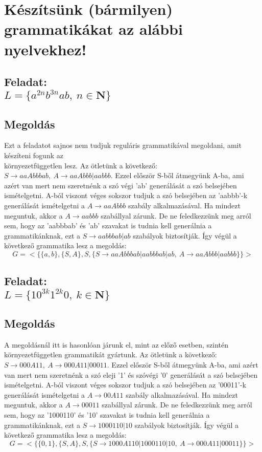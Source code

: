\documentclass[12pt]{article}
\begin{document}
\section{Készítsünk (bármilyen) grammatikákat az alábbi nyelvekhez!}
\subsection{Feladat: \\
$ L=\{ a^{2n}b^{3n}ab, \ n \in \mathbf{N} \} $}
\maketitle
\subsection{Megoldás}
Ezt a feladatot sajnos nem tudjuk reguláris grammatikával megoldani, amit készíteni fogunk az \\
környezetfüggetlen lesz. Az ötletünk a következő: $ S \rightarrow aaAbbbab, \ A \rightarrow aaAbbb|aabbb $.
Ezzel először S-ből átmegyünk A-ba, ami azért van mert nem szeretnénk a szó végi 'ab' generálását a szó
belsejében ismételgetni. A-ból viszont véges sokszor tudjuk a szó belsejében az 'aabbb'-k generálását
ismételgetni a $ A \rightarrow aaAbbb $ szabály alkalmazásával. Ha mindezt meguntuk, akkor
a $ A \rightarrow aabbb $ szabállyal zárunk. De ne feledkezzünk meg arról sem, hogy az 'aabbbab' és 'ab'
szavakat is tudnia kell generálnia a grammatikánknak, ezt a $ S \rightarrow aabbbab|ab $ szabályok biztosítják.
Így végül a következő grammatika lesz a megoldás:
$$ G=<\{ \{a,b \}, \{S,A \}, S, \{ S \rightarrow aaAbbbab|aabbbab|ab, \ A \rightarrow aaAbbb|aabbb \} \}> $$

\subsection{Feladat: \\
$ L=\{ 10^{3k}1^{2k}0, \ k \in \mathbf{N} \} $}
\maketitle
\subsection{Megoldás}
A megoldásnál itt is hasonlóan járunk el, mint az előző esetben, szintén környezetfüggetlen grammatikát gyártunk.
Az ötletünk a következő: $ S \rightarrow 000A11, \ A \rightarrow 000A11|00011 $.
Ezzel először S-ből átmegyünk A-ba, ami azért van mert nem szeretnénk a szó eleji '1' és szóvégi '0' 
generálását a szó belsejében ismételgetni. A-ból viszont véges sokszor tudjuk a szó belsejében az '00011'-k
generálását ismételgetni a $ A \rightarrow 00A11 $ szabály alkalmazásával. Ha mindezt meguntuk, akkor
a $ A \rightarrow 00011 $ szabállyal zárunk. De ne feledkezzünk meg arról sem, hogy az '1000110' és '10'
szavakat is tudnia kell generálnia a grammatikánknak, ezt a $ S \rightarrow 1000110|10 $ szabályok biztosítják.
Így végül a következő grammatika lesz a megoldás:
$$ G=<\{ \{0,1 \}, \{S,A \}, S, \{ S \rightarrow 1000A110|1000110|10, \ A \rightarrow 000A11|00011 \} \}> $$
\end{document}
